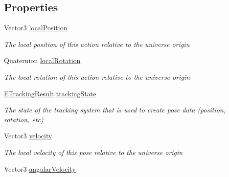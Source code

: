 \subsection*{Properties}
\begin{DoxyCompactItemize}
\item 
Vector3 \mbox{\hyperlink{interface_valve_1_1_v_r_1_1_i_steam_v_r___action___pose_af4aa96a619188955df2435a5d025bcd0}{local\+Position}}
\begin{DoxyCompactList}\small\item\em The local position of this action relative to the universe origin \end{DoxyCompactList}\item 
Quaternion \mbox{\hyperlink{interface_valve_1_1_v_r_1_1_i_steam_v_r___action___pose_a16e3cc27d2204c99da1a72cd9df722bc}{local\+Rotation}}
\begin{DoxyCompactList}\small\item\em The local rotation of this action relative to the universe origin \end{DoxyCompactList}\item 
\mbox{\hyperlink{namespace_valve_1_1_v_r_abe6feab98f33191b7c27b4292012e90a}{E\+Tracking\+Result}} \mbox{\hyperlink{interface_valve_1_1_v_r_1_1_i_steam_v_r___action___pose_a9e1c745cb4003d1cad5ea7df89971e5e}{tracking\+State}}
\begin{DoxyCompactList}\small\item\em The state of the tracking system that is used to create pose data (position, rotation, etc) \end{DoxyCompactList}\item 
Vector3 \mbox{\hyperlink{interface_valve_1_1_v_r_1_1_i_steam_v_r___action___pose_a3e9fbbea68d0351c964de8ad71701c0f}{velocity}}
\begin{DoxyCompactList}\small\item\em The local velocity of this pose relative to the universe origin \end{DoxyCompactList}\item 
Vector3 \mbox{\hyperlink{interface_valve_1_1_v_r_1_1_i_steam_v_r___action___pose_a7f31eba29e24c48263a1106a7cae1510}{angular\+Velocity}}

\end{DoxyCompactItemize}
